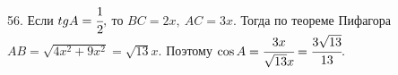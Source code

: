 56. Если $tg A=\cfrac{1}{2},$ то $BC=2x,\ AC=3x.$ Тогда по теореме Пифагора $AB=\sqrt{4x^2+9x^2}=\sqrt{13}x.$ Поэтому $\cos A=\cfrac{3x}{\sqrt{13}x}=\cfrac{3\sqrt{13}}{13}.$\\

